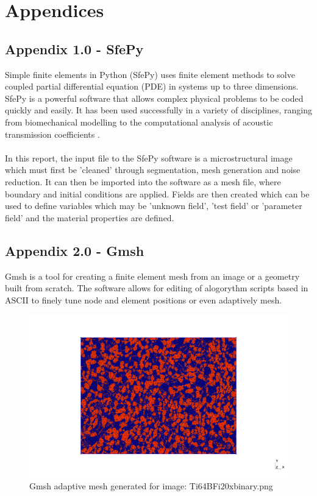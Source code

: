 \documentclass[\report.tex]{subfiles}
\begin{document}
\section{Appendices}

\subsection{Appendix 1.0 - SfePy}
Simple finite elements in Python (SfePy) uses finite element methods to solve coupled partial differential equation (PDE) in systems up to three dimensions. SfePy is a powerful software that allows complex physical problems to be coded quickly and easily. It has been used successfully in a variety of disciplines, ranging from biomechanical modelling \cite{biomedapplication} to the computational analysis of acoustic transmission coefficients \cite{AcousticTransmission}.\\ \\In this report, the input file to the SfePy software is a microstructural image which must first be 'cleaned' through segmentation, mesh generation and noise reduction. It can then be imported into the software as a mesh file, where boundary and initial conditions are applied. Fields are then created which can be used to define variables which may be 'unknown field', 'test field' or 'parameter field' \cite{FEMinSfePy} and the material properties are defined.

\subsection{Appendix 2.0 - Gmsh}
Gmsh is a tool for creating a finite element mesh from an image or a geometry built from scratch. The software allows for editing of alogorythm scripts based in ASCII to finely tune node and element positions or even adaptively mesh.
\begin{figure}[h!]
    \centering
    \includegraphics[width=17cm]{Images/out.png}
    \caption{Gmsh adaptive mesh generated for image: Ti64BFi20xbinary.png}
    \label{fig:gmsh}
\end{figure}
\end{document}
